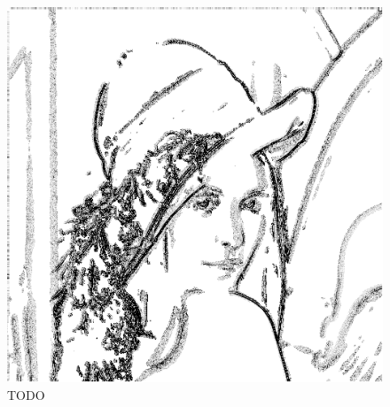 \documentclass[12pt]{amsart}
\begin{document}
\begin{figure}
\endminipage\hfill
{}%
\includegraphics[width=\linewidth]{lena_laplacian_edges.png}
\endminipage
\caption{TODO}\label{fig:TODO}
\end{figure}
\end{document}

